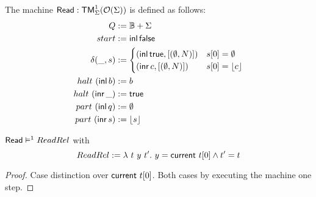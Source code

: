 \begin{definition}[$\MS{Read}$][ReadChar]
  The machine $\mathsf{Read} : \mathsf{TM}_\Sigma^1(\mathcal{O}(\Sigma))$ is defined as follows:
  \begin{align*}
    Q          &:= \mathbb{B}+\Sigma \\
    start      &:= \operatorname{\mathsf{inl}} \mathsf{false} \\
    \delta (\_, s) &:=
                     \begin{cases}
                       (\operatorname{\mathsf{inl}} \mathsf{true}, \left[ (\emptyset, N) \right]) & s[0] = \emptyset \\
                       (\operatorname{\mathsf{inr}} c, \left[ (\emptyset, N) \right])     & s[0] = \left\lfloor {c} \right\rfloor
                     \end{cases} \\
    halt   ~ (\operatorname{\mathsf{inl}}  b) &:= b \\
    halt   ~ (\operatorname{\mathsf{inr}} \_) &:= \mathsf{true} \\
    part   ~ (\operatorname{\mathsf{inl}}  q) &:= \emptyset \\
    part   ~ (\operatorname{\mathsf{inr}}  s) &:= \left\lfloor {s} \right\rfloor
  \end{align*}
\end{definition}


\begin{lemma}
  \label{lem:Read_Sem} $\mathsf{Read} \mathrel{\vDash^{1}} ReadRel$ with
  \[
    ReadRel := \lambda~t~y~t'.~ y = \mathsf{current}~t[0] \land t' = t
  \]
\end{lemma}
\begin{proof}
  Case distinction over $\mathsf{current}~t[0]$.  Both cases by executing the machine one step.
\end{proof}



